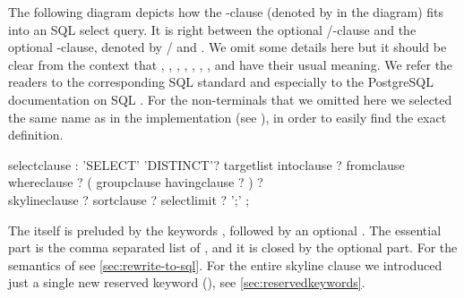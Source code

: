 

\railnontermfont{\rmfamily\itshape}
\railtermfont{\ttfamily\upshape\small}
\railboxheight 12pt
\railinit

The following diagram depicts how the -clause
(denoted by  in the diagram) fits into an SQL
select query.  It is right between the optional /-clause and the optional -clause, denoted by  /  and
. We omit some details here but it should be clear
from the context that , ,
, , ,
, , and  have
their usual meaning. We refer the readers to the corresponding SQL standard and
especially to the PostgreSQL documentation on SQL
. For the non-terminals that we omitted
here we selected the same name as in the implementation (see
), in order to easily find the exact definition.

%
\begin{rail}
selectclause :
    'SELECT' 'DISTINCT'? targetlist intoclause ? fromclause \\ 
    whereclause ? ( groupclause havingclause ? ) ? \\
    skylineclause ? sortclause ? selectlimit ? ';' ;
\end{rail}


The  itself is preluded by the keywords
, followed by an optional .
The essential part is the comma separated list of
, and it is closed by the optional 
 part. For the semantics of 
see \autoref{sec:rewrite-to-sql}. For the entire skyline clause we
introduced just a single new reserved keyword (),
see \autoref{sec:reservedkeywords}.


